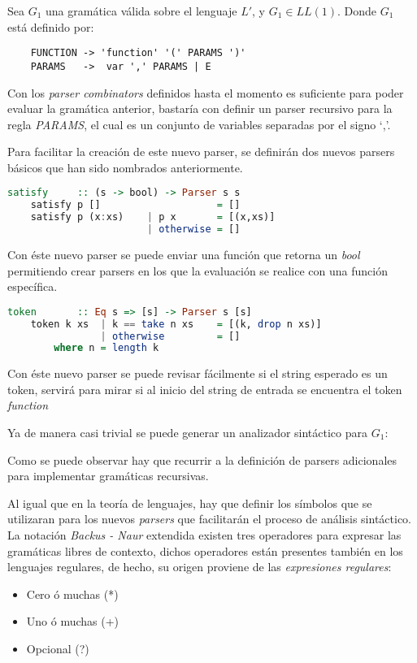\begin{exmp}
	Sea $G_1$ una gramática válida sobre el lenguaje $L'$, y $G_1 \in LL(1)$.
	Donde $G_1$ está definido por:
	
	\begin{lstlisting}
	FUNCTION -> 'function' '(' PARAMS ')'
	PARAMS   ->  var ',' PARAMS | E
	\end{lstlisting}
\end{exmp}
	Con los \emph{parser combinators} definidos hasta el momento es suficiente para poder evaluar la gramática anterior, bastaría con definir un parser recursivo para la regla \emph{PARAMS}, el cual es un conjunto de variables separadas por el signo `,'.
	
	Para facilitar la creación de este nuevo parser, se definirán dos nuevos parsers básicos que han sido nombrados anteriormente.
		
	\begin{lstlisting}[language=Haskell, caption=Parser elemental SAT]
	satisfy		:: (s -> bool) -> Parser s s
	satisfy p []					= []
	satisfy p (x:xs) 	| p x		= [(x,xs)]
						| otherwise	= []
	\end{lstlisting}
	
	Con éste nuevo parser se puede enviar una función que retorna un \emph{bool} permitiendo crear parsers en los que la evaluación se realice con una función específica.
	\begin{lstlisting}[language=Haskell, caption=Parser elemental token]
	token 		:: Eq s => [s] -> Parser s [s]
	token k xs	| k == take n xs 	= [(k, drop n xs)]
				| otherwise			= []
		where n = length k
	\end{lstlisting}
	
	Con éste nuevo parser se puede revisar fácilmente si el string esperado es un token, servirá para mirar si al inicio del string de entrada se encuentra el token \emph{function}
	
	Ya de manera casi trivial se puede generar un analizador sintáctico para $G_1$:
	
	
	
	Como se puede observar hay que recurrir a la definición de parsers adicionales para implementar gramáticas recursivas.
	
	Al igual que en la teoría de lenguajes, hay que definir los símbolos que se utilizaran para los nuevos \emph{parsers} que facilitarán el proceso de análisis sintáctico. La notación \emph{Backus - Naur} extendida existen tres operadores para expresar las gramáticas libres de contexto, dichos operadores están presentes también en los lenguajes regulares, de hecho, su origen proviene de las \emph{expresiones regulares}:
	\begin{itemize}
		\item Cero ó muchas (*)
		\item Uno ó muchas (+)
		\item Opcional (?)
	\end{itemize}
	
